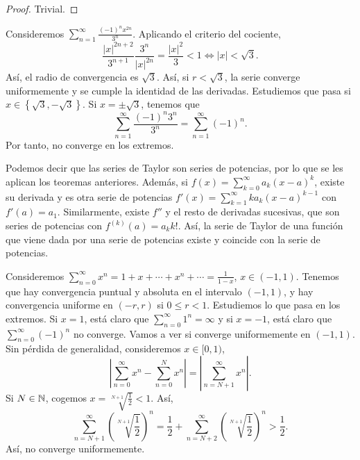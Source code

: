 \begin{proof}
Trivial.
\end{proof}
\begin{eg}
\normalfont Consideremos $\displaystyle \sum^{\infty}_{n = 1}\frac{\left(-1\right)^{n}x^{2n}}{3^{n}} $. Aplicando el criterio del cociente,
\[ \frac{ \left|x\right|^{2n+2}}{3^{n+1}}\frac{3^{n}}{ \left|x\right|^{2n}} = \frac{ \left|x\right|^{2}}{3} < 1 \iff \left|x\right| < \sqrt{3} .\]
Así, el radio de convergencia es $\displaystyle \sqrt{3} $. Así, si $\displaystyle r < \sqrt{3} $, la serie converge uniformemente y se cumple la identidad de las derivadas. Estudiemos que pasa si $\displaystyle x \in \left\{ \sqrt{3}, -\sqrt{3}\right\}  $. Si $\displaystyle x = \pm\sqrt{3} $, tenemos que 
\[\sum^{\infty}_{n = 1}\frac{\left(-1\right)^{n}3^{n}}{3^{n}} = \sum^{\infty}_{n = 1}\left(-1\right)^{n} .\]
Por tanto, no converge en los extremos.
\end{eg}
\begin{observation}
\normalfont Podemos decir que las series de Taylor son series de potencias, por lo que se les aplican los teoremas anteriores. Además, si $\displaystyle f\left(x\right) = \sum^{\infty}_{k=0}a_{k}\left(x-a\right)^{k} $, existe su derivada y es otra serie de potencias $\displaystyle f'\left(x\right) = \sum^{\infty}_{k=1}ka_{k}\left(x-a\right)^{k-1} $ con $\displaystyle f'\left(a\right) = a_{1} $. Similarmente, existe $\displaystyle f'' $ y el resto de derivadas sucesivas, que son series de potencias con $\displaystyle f^{\left(k\right)}\left(a\right) = a_{k}k! $. Así, la serie de Taylor de una función que viene dada por una serie de potencias existe y coincide con la serie de potencias.
\end{observation}
\begin{eg}
	\normalfont Consideremos $\displaystyle \sum^{\infty}_{n = 0}x^{n} = 1 + x + \cdots + x^{n} + \cdots = \frac{1}{1-x} $, $\displaystyle x \in \left(-1,1\right) $. Tenemos que hay convergencia puntual y absoluta en el intervalo $\displaystyle \left(-1,1\right) $, y hay convergencia uniforme en $\displaystyle \left(-r,r\right) $ si $\displaystyle 0\leq r < 1 $. Estudiemos lo que pasa en los extremos. Si $\displaystyle x = 1 $, está claro que $\displaystyle \sum^{\infty}_{n = 0}1^{n} = \infty $ y si $\displaystyle x = - 1 $, está claro que $\displaystyle \sum^{\infty}_{n = 0}\left(-1\right)^{n} $ no converge. Vamos a ver si converge uniformemente en $\displaystyle \left(-1,1\right) $. Sin pérdida de generalidad, consideremos $\displaystyle x \in [0,1) $,
\[ \left|\sum^{\infty}_{n = 0}x^{n}-\sum^{N}_{n = 0}x^{n}\right| = \left|\sum^{\infty}_{n = N+1}x^{n}\right| .\]
Si $\displaystyle N \in \mathbb{N} $, cogemos $\displaystyle x = \sqrt[N+1]{\frac{1}{2}} < 1 $. Así, 
\[ \sum^{\infty}_{n = N + 1}\left(\sqrt[N+1]{\frac{1}{2}}\right)^{n} = \frac{1}{2} + \sum^{\infty}_{n = N+2} \left(\sqrt[N+1]{\frac{1}{2}}\right)^{n} > \frac{1}{2}.\]
Así, no converge uniformemente. 
\end{eg}
